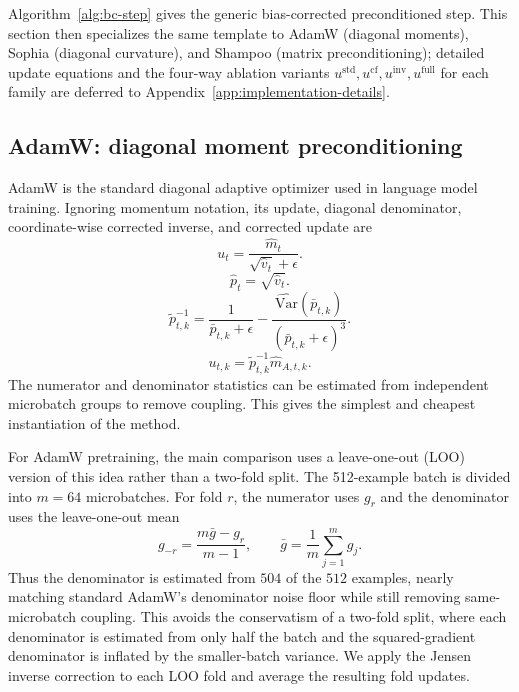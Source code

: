 \documentclass{article}
\newcommand{\Var}{\mathrm{Var}}
\begin{document}
Algorithm~\ref{alg:bc-step} gives the generic bias-corrected preconditioned step. This section then specializes the same template to AdamW (diagonal moments), Sophia (diagonal curvature), and Shampoo (matrix preconditioning); detailed update equations and the four-way ablation variants $u^{\mathrm{std}}, u^{\mathrm{cf}}, u^{\mathrm{inv}}, u^{\mathrm{full}}$ for each family are deferred to Appendix~\ref{app:implementation-details}.

\subsection{AdamW: diagonal moment preconditioning}

AdamW is the standard diagonal adaptive optimizer used in language model training. Ignoring momentum notation, its update, diagonal denominator, coordinate-wise corrected inverse, and corrected update are
\begin{equation}
    u_t = \frac{\hat m_t}{\sqrt{\hat v_t}+\epsilon}.
\end{equation}
\begin{equation}
    \hat p_t = \sqrt{\hat v_t}.
\end{equation}
\begin{equation}
    \widetilde p_{t,k}^{-1}
    =
    \frac{1}{\bar p_{t,k}+\epsilon}
    -
    \frac{\widehat{\Var}(\bar p_{t,k})}{(\bar p_{t,k}+\epsilon)^3}.
\end{equation}
\begin{equation}
    u_{t,k}
    =
    \widetilde p_{t,k}^{-1}\hat m_{A,t,k}.
\end{equation}
The numerator and denominator statistics can be estimated from independent microbatch groups to remove coupling. This gives the simplest and cheapest instantiation of the method.

For AdamW pretraining, the main comparison uses a leave-one-out (LOO) version of this idea rather than a two-fold split. The 512-example batch is divided into $m=64$ microbatches. For fold $r$, the numerator uses $g_r$ and the denominator uses the leave-one-out mean
\begin{equation}
    g_{-r}
    =
    \frac{m\bar g-g_r}{m-1},
    \qquad
    \bar g=\frac{1}{m}\sum_{j=1}^m g_j.
\end{equation}
Thus the denominator is estimated from $504$ of the $512$ examples, nearly matching standard AdamW's denominator noise floor while still removing same-microbatch coupling. This avoids the conservatism of a two-fold split, where each denominator is estimated from only half the batch and the squared-gradient denominator is inflated by the smaller-batch variance. We apply the Jensen inverse correction to each LOO fold and average the resulting fold updates.
\end{document}

